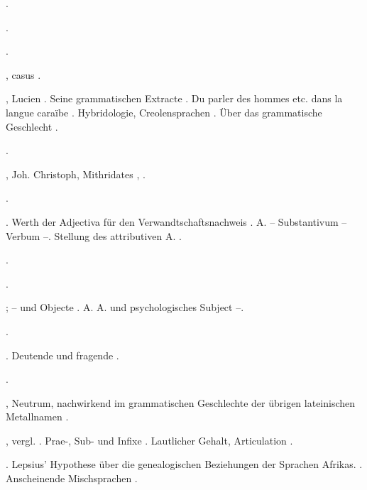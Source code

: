 \begin{register}


 \pageref{sp.102}.


 \pageref{sp.236}.

 \pageref{sp.102}\sed{, \pageref{sp.459}}.

, casus \pageref{sp.102}.

, Lucien \pageref{sp.31}. Seine grammatischen Extracte \pageref{sp.52}. Du parler des hommes etc. dans la langue caraïbe \pageref{sp.248}. Hybridologie, Creolensprachen \pageref{sp.279}. Über das grammatische Geschlecht \pageref{sp.481}.

 \pageref{sp.180}.

, Joh. Christoph, Mithridates \pageref{sp.28}, \pageref{sp.31}.

 \pageref{sp.114}.

 \pageref{sp.101}. Werth der Adjectiva für den Verwandtschaftsnachweis \pageref{sp.152}. A. – Substantivum – Verbum \pageref{sp.382}–\pageref{sp.385}. Stellung des attributiven A. \pageref{sp.401}.


 \pageref{sp.101}.

 \pageref{sp.104}.

 \pageref{sp.101}; – und Objecte \pageref{sp.102}. A. A. und psychologisches Subject \pageref{sp.371}–\pageref{sp.372}.

 \pageref{sp.104}.

 \pageref{sp.101}. Deutende und fragende \pageref{sp.385}.

 \pageref{sp.21}.

, Neutrum, nachwirkend im grammatischen Geschlechte der übrigen lateinischen Metallnamen \pageref{sp.237}.

, vergl. . Prae-, Sub- und Infixe \pageref{sp.349}. Lautlicher Gehalt, Articulation \pageref{sp.436}.


. Lepsius’ Hypothese über die genealogischen Beziehungen der Sprachen Afrikas. \pageref{sp.282}. Anscheinende Mischsprachen \pageref{sp.406}.


\end{register}
